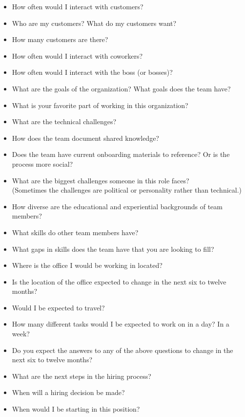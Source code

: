 \begin{itemize}
    \item How often would I interact with customers? 
    \item Who are my customers? What do my customers want?
    \item How many customers are there?
    \item How often would I interact with coworkers? 
    \item How often would I interact with the boss (or bosses)? 
    \item What are the goals of the organization? What goals does the team have?

    \item What is your favorite part of working in this organization?

    \item What are the technical challenges?
    \item How does the team document shared knowledge?
    \item Does the team have current onboarding materials to reference? Or is the process more social?
    \item What are the biggest challenges someone in this role faces? \\
    (Sometimes the challenges are political or personality rather than technical.)
    \item How diverse are the educational and experiential backgrounds of team members?
    \item What skills do other team members have?
    \item What gaps in skills does the team have that you are looking to fill?
    
    \item Where is the office I would be working in located?
    \item Is the location of the office expected to change in the next six to twelve months?
    \item Would I be expected to travel?
    
    \item How many different tasks would I be expected to work on in a day? In a week?
    
    \item Do you expect the answers to any of the above questions to change in the next six to twelve months?

    \item What are the next steps in the hiring process?
    \item When will a hiring decision be made?
    \item When would I be starting in this position?
    

\end{itemize}
